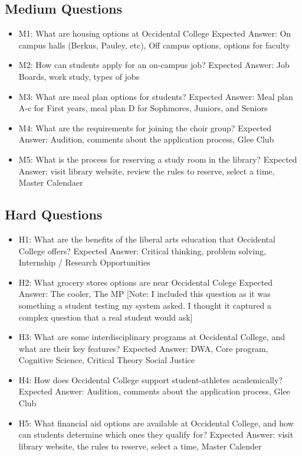 \documentclass[10pt,twocolumn]{article}
\begin{document}
\subsection{Medium Questions}
\begin{itemize}
    \item M1: What are housing options at Occidental College
    \newline Expected Answer: On campus halls (Berkus, Pauley, etc), Off campus options, options for faculty
    \item M2: How can students apply for an on-campus job?
    \newline Expected Answer: Job Boards, work study, types of jobs 
    \item M3: What are meal plan options for students?\newline
    Expected Answer: Meal plan A-c for First years, meal plan D for Sophmores, Juniors, and Seniors
    \item M4: What are the requirements for joining the choir group?\newline
    Expected Answer: Audition, comments about the application process, Glee Club
    \item M5: What is the process for reserving a study room in the library?\newline
    Expected Answer: visit library website, review the rules to reserve, select a time, Master Calendaer
\end{itemize}

\subsection{Hard Questions}
\begin{itemize}
    \item H1: What are the benefits of the liberal arts education that Occidental College offers?\newline
    Expected Answer: Critical thinking, problem solving, Internship / Research Opportunities
    \item H2: What grocery stores options are near Occidental Colege\newline
    Expected Answer: The cooler, The MP [Note: I included this question as it was something a student testing my system asked. I thought it captured a complex question that a real student would ask]
    \item H3: What are some interdisciplinary programs at Occidental College, and what are their key features?\newline
    Expected Answer: DWA, Core program, Cognitive Science, Critical Theory Social Justice
    \item H4: How does Occidental College support student-athletes academically? \newline
    Expected Answer: Audition, comments about the application process, Glee Club
    \item H5: What financial aid options are available at Occidental College, and how can students determine which ones they qualify for?
    \newline
    Expected Answer: visit library website, the rules to reserve, select a time, Master Calender
\end{itemize}
\end{document}
